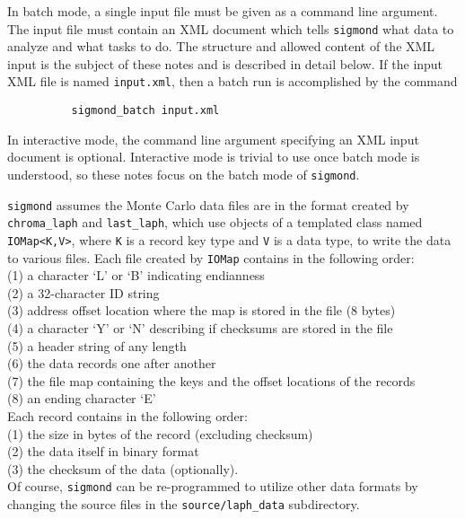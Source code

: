 \documentclass[12pt]{article}
\newcommand{\sigmond}{\texttt{sigmond} }
\newcommand{\vb}{\texttt}
\begin{document}
In batch mode, a single input file must be given as a command line
argument.  The input file must contain an XML document which
tells \sigmond what data to analyze and what tasks to do.  The structure
and allowed content of the XML input is the subject of these notes and
is described in detail below.  If the input XML file is named
\vb{input.xml}, then a batch run is accomplished by the command
\begin{verbatim}
          sigmond_batch input.xml
\end{verbatim}

In interactive mode, the command line argument specifying an XML
input document is optional.  Interactive mode is trivial to use
once batch mode is understood, so these notes focus on the batch mode
of \vb{sigmond}.

\vb{sigmond} assumes the Monte Carlo data files are in the format
created by \vb{chroma\_laph} and \vb{last\_laph}, which use objects
of a templated class named \vb{IOMap<K,V>}, where \vb{K} is a record 
key type and \vb{V} is a data type, to write the data to various
files.  Each file created by \vb{IOMap} contains in the following order:\\
\hspace*{20pt}(1) a character `L' or `B' indicating endianness\\
\hspace*{20pt}(2) a 32-character ID string\\
\hspace*{20pt}(3) address offset location where the map is stored in the file (8 bytes) \\
\hspace*{20pt}(4) a character `Y' or `N' describing if checksums are stored in the file \\
\hspace*{20pt}(5) a header string of any length\\
\hspace*{20pt}(6) the data records one after another \\
\hspace*{20pt}(7) the file map containing the keys and the offset locations of the records\\
\hspace*{20pt}(8) an ending character `E'\\
Each record contains in the following order:\\
\hspace*{20pt}(1) the size in bytes of the record (excluding checksum)\\
\hspace*{20pt}(2) the data itself in binary format\\
\hspace*{20pt}(3) the checksum of the data (optionally).\\
Of course, \vb{sigmond} can be re-programmed to utilize other data formats
by changing the source files in the \vb{source/laph\_data} subdirectory.
\end{document}
